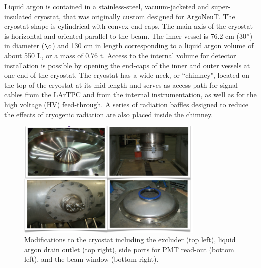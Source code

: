 \documentclass[DIV=calc, paper=a4, fontsize=10pt, twocolumn]{scrartcl}	 %
\begin{document}
{Liquid argon is contained in a stainless-steel, vacuum-jacketed and super-insulated cryostat, that was originally custom designed for ArgoNeuT.  The cryostat shape is cylindrical with convex end-caps. The main axis of the cryostat is horizontal and oriented parallel to the beam.  The inner vessel is $76.2$ cm (30'') in diameter ($\o$) and 130 cm in length corresponding to a liquid argon volume of about 550 L, or a mass of 0.76 t.  Access to the internal volume for detector installation is possible by opening the end-caps of the inner and outer vessels at one end of the cryostat.  The cryostat has a wide neck, or ``chimney",  located on the top of the cryostat at its mid-length and serves as access path for signal cables from the LArTPC and from the internal instrumentation, as well as for the high voltage (HV) feed-through. A series of radiation baffles designed to reduce the effects of cryogenic radiation are also placed inside the chimney.
\begin{figure}[h!]
\centering
\includegraphics[width=3.5in]{Figures/Cryostat-mods}
\caption{ {\scriptsize \sf  Modifications to the cryostat including the excluder (top left), liquid argon drain outlet (top right), side ports for PMT read-out (bottom left), and the beam window (bottom right). } }
\label{fig:CryostatMods}
\end{figure}

}
\end{document}

